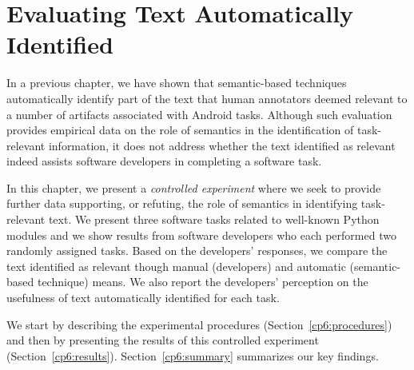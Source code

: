 \setcounter{chapter}{5}
\setcounter{rq}{1}


\chapter{Evaluating Text Automatically Identified}
\label{ch:assisting}







In a previous chapter, we have shown that semantic-based techniques automatically identify part of the text 
that human annotators deemed relevant to a number of artifacts associated with Android tasks.
Although such evaluation provides empirical data on the role of semantics in the identification of task-relevant information, it does not address whether the text identified as relevant indeed assists software developers in completing a software task.



In this chapter, we present a \textit{controlled experiment} where we seek to provide further data supporting, or refuting, the role of semantics in identifying task-relevant text. 
We present three software tasks related to well-known Python modules and we show 
results from  software developers who each performed two randomly assigned tasks. 
Based on the developers' responses, we compare the text identified as relevant though manual (developers)
and automatic (semantic-based technique) means. We also report the developers' perception on the usefulness of text automatically identified for each task. 


We start by describing the experimental procedures (Section~\ref{cp6:procedures}) and then by presenting the results of this controlled experiment (Section~\ref{cp6:results}). Section~\ref{cp6:summary} summarizes our key findings.






